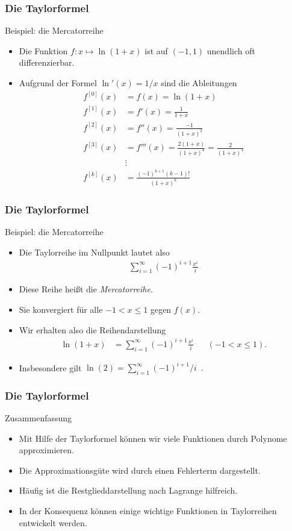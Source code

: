 \documentclass{beamer}
\renewcommand{\emph}[1]{{\textcolor{solarizedRed}{\itshape #1}}}
\renewcommand{\ae}{\"a}
\renewcommand{\oe}{\"o}
\newcommand{\ue}{\"u}
\newcommand{\mytitle}{Die Taylorformel}
\begin{document}
\begin{frame}\frametitle{\mytitle}
	\begin{block}{Beispiel: die Mercatorreihe}
	\begin{itemize}
		\item Die Funktion $f:x\mapsto\ln(1+x)$ ist auf $(-1,1)$ unendlich oft differenzierbar.
		\item Aufgrund der Formel $\ln'(x)=1/x$ sind die Ableitungen
			\begin{align*}
				f^{[0]}(x)&=f(x)=\ln(1+x)\\
				f^{[1]}(x)&=f'(x)=\frac{1}{1+x}\\
				f^{[2]}(x)&=f''(x)=\frac{-1}{(1+x)^2}\\
				f^{[3]}(x)&=f'''(x)=\frac{2(1+x)}{(1+x)^4}=\frac{2}{(1+x)^3}\\
						  &\vdots\\
				f^{[k]}(x)&=\frac{(-1)^{k+1}(k-1)!}{(1+x)^k}
			\end{align*}
	\end{itemize}
	\end{block}
\end{frame}

\begin{frame}\frametitle{\mytitle}
	\begin{block}{Beispiel: die Mercatorreihe}
	\begin{itemize}
		\item Die Taylorreihe im Nullpunkt lautet also
			\begin{align*}
				\sum_{i=1}^\infty(-1)^{i+1}\frac{x^i}{i}
			\end{align*}
		\item Diese Reihe hei\ss t die \emph{Mercatorreihe}.
		\item Sie konvergiert f\ue r alle $-1<x\leq 1$ gegen $f(x)$.
		\item Wir erhalten also die Reihendarstellung
			\begin{align*}
				\ln(1+x)&=\sum_{i=1}^\infty(-1)^{i+1}\frac{x^i}{i}&&(-1<x\leq1).
			\end{align*}
		\item Insbesondere gilt $\ln(2)=\sum_{i=1}^\infty(-1)^{i+1}/i\enspace .$
	\end{itemize}
	\end{block}
\end{frame}

\begin{frame}\frametitle{\mytitle}
	\begin{block}{Zusammenfassung}
	\begin{itemize}
		\item Mit Hilfe der Taylorformel k\oe nnen wir viele Funktionen durch Polynome approximieren.
		\item Die Approximationsg\ue te wird durch einen Fehlerterm dargestellt.
		\item H\ae ufig ist die Restglieddarstellung nach Lagrange hilfreich.
		\item In der Konsequenz k\oe nnen einige wichtige Funktionen in Taylorreihen entwickelt werden.
	\end{itemize}
	\end{block}
\end{frame}
\end{document}
